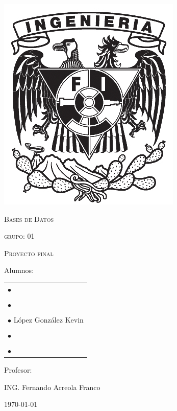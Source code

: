 \documentclass[12pt,letterpaper]{article}
\begin{document}
\begin{titlepage}
\begin{minipage}{0.14\linewidth}
			\includegraphics[width=\linewidth]{img/shieldFi}
		\end{minipage}
		
		\centering
		\vspace{1.5cm}
		{\scshape\Large Bases de Datos \par}
		{\scshape\Large grupo: 01\par}
		\vspace{3cm}
		{\scshape\Huge Proyecto final \par}
		\vspace{0.8cm}
		\vfill
		{\Large Alumnos: \par}
		\begin{center}
			\begin{tabular}{l}
				$\bullet$ \\
				\\
				$\bullet$ \\
				\\
				$\bullet$ {\Large López González Kevin } \\
				\\
				$\bullet$ \\
				\\
				$\bullet$ \\
			\end{tabular}
		\end{center}
		\vfill
		{\Large Profesor: \par}
		{\Large ING. Fernando Arreola Franco \par}
		\vfill
		{\Large \today \par}
	\end{titlepage}
\end{document}
